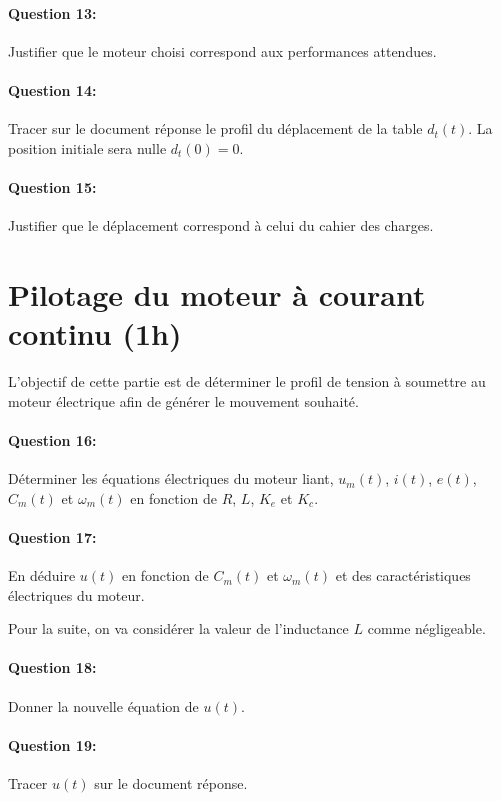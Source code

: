 \paragraph{Question 13:} Justifier que le moteur choisi correspond aux performances attendues.

\paragraph{Question 14:} Tracer sur le document réponse le profil du déplacement de la table $d_t(t)$. La position initiale sera nulle $d_t(0)=0$.

\paragraph{Question 15:} Justifier que le déplacement correspond à celui du cahier des charges.

\section{Pilotage du moteur à courant continu (1h)}

L'objectif de cette partie est de déterminer le profil de tension à soumettre au moteur électrique afin de générer le mouvement souhaité.

\paragraph{Question 16:} Déterminer les équations électriques du moteur liant, $u_m(t)$, $i(t)$, $e(t)$, $C_m(t)$ et $\omega_m(t)$ en fonction de $R$, $L$, $K_e$ et $K_c$.

\paragraph{Question 17:} En déduire $u(t)$ en fonction de $C_m(t)$ et $\omega_m(t)$ et des caractéristiques électriques du moteur. 

Pour la suite, on va considérer la valeur de l'inductance $L$ comme négligeable.

\paragraph{Question 18:} Donner la nouvelle équation de $u(t)$.

\paragraph{Question 19:} Tracer $u(t)$ sur le document réponse.

